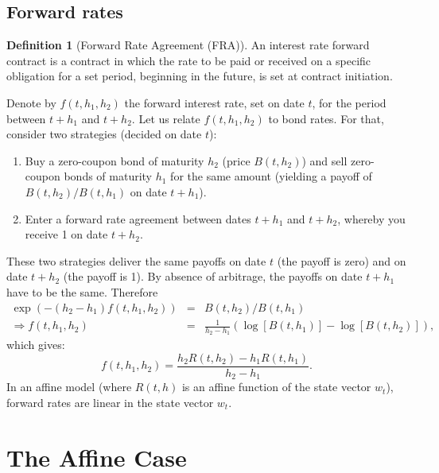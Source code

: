 \documentclass[
  12pt,
]{book}
\providecommand{\tightlist}{%
  \setlength{\itemsep}{0pt}\setlength{\parskip}{0pt}}
\theoremstyle{definition}
\newtheorem{definition}{Definition}[chapter]
\theoremstyle{definition}
\theoremstyle{definition}
\theoremstyle{definition}
\theoremstyle{remark}
\begin{document}
\hypertarget{FWD}{%
\subsection{Forward rates}\label{FWD}}

\begin{definition}[Forward Rate Agreement (FRA)]
\protect\hypertarget{def:FWD}{}\label{def:FWD}An interest rate forward contract is a contract in which the rate to be paid or received on a specific obligation for a set period, beginning in the future, is set at contract initiation.
\end{definition}

Denote by \(f(t,h_1,h_2)\) the forward interest rate, set on date \(t\), for the period between \(t+h_1\) and \(t+h_2\). Let us relate \(f(t,h_1,h_2)\) to bond rates. For that, consider two strategies (decided on date \(t\)):

\begin{enumerate}
\def\labelenumi{\arabic{enumi}.}
\tightlist
\item
  Buy a zero-coupon bond of maturity \(h_2\) (price \(B(t,h_2)\)) and sell zero-coupon bonds of maturity \(h_1\) for the same amount (yielding a payoff of \(B(t,h_2)/B(t,h_1)\) on date \(t+h_1\)).
\item
  Enter a forward rate agreement between dates \(t+h_1\) and \(t+h_2\), whereby you receive 1 on date \(t+h_2\).
\end{enumerate}

These two strategies deliver the same payoffs on date \(t\) (the payoff is zero) and on date \(t+h_2\) (the payoff is 1). By absence of arbitrage, the payoffs on date \(t+h_1\) have to be the same. Therefore
\begin{eqnarray*}
\exp(-(h_2 - h_1)f(t,h_1,h_2)) &=& B(t,h_2)/B(t,h_1) \\
\Rightarrow f(t,h_1,h_2) &=& \frac{1}{h_2 - h_1}(\log[B(t,h_1)] - \log[B(t,h_2)]),
\end{eqnarray*}
which gives:
\begin{equation}
\boxed{f(t,h_1,h_2) = \frac{h_2 R(t,h_2) - h_1 R(t,h_1)}{h_2 - h_1}.}\label{eq:forward}
\end{equation}
In an affine model (where \(R(t,h)\) is an affine function of the state vector \(w_t\)), forward rates are linear in the state vector \(w_t\).

\hypertarget{RiskFreeAffine}{%
\section{The Affine Case}\label{RiskFreeAffine}}
\end{document}
